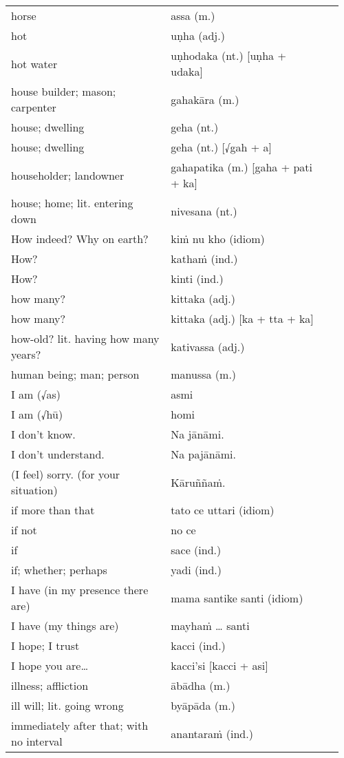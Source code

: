 \documentclass[a5paper]{memoir}
\begin{document}
\begin{longtable}{L{0.48\linewidth} L{0.48\linewidth} H}
horse & assa (m.) & \\[0pt]
hot & uṇha (adj.) & \\[0pt]
hot water & uṇhodaka (nt.) [uṇha + udaka] & \\[0pt]
house builder; mason; carpenter & gahakāra (m.) & \\[0pt]
house; dwelling & geha (nt.) & \\[0pt]
house; dwelling & geha (nt.) [√gah + a] & \\[0pt]
householder; landowner & gahapatika (m.) [gaha + pati + ka] & \\[0pt]
house; home; lit. entering down & nivesana (nt.) & \\[0pt]
How indeed? Why on earth? & kiṁ nu kho (idiom) & \\[0pt]
How? & kathaṁ (ind.) & \\[0pt]
How? & kinti (ind.) & \\[0pt]
how many? & kittaka (adj.) & \\[0pt]
how many? & kittaka (adj.) [ka + tta + ka] & \\[0pt]
how-old? lit. having how many years? & kativassa (adj.) & \\[0pt]
human being; man; person & manussa (m.) & \\[0pt]
I am (√as) & asmi & \\[0pt]
I am (√hū) & homi & \\[0pt]
I don't know. & Na jānāmi. & \\[0pt]
I don't understand. & Na pajānāmi. & \\[0pt]
(I feel) sorry. (for your situation) & Kāruññaṁ. & \\[0pt]
if more than that & tato ce uttari (idiom) & \\[0pt]
if not & no ce & \\[0pt]
if & sace (ind.) & \\[0pt]
if; whether; perhaps & yadi (ind.) & \\[0pt]
I have (in my presence there are) & mama santike santi (idiom) & \\[0pt]
I have (my things are) & mayhaṁ \ldots{} santi & \\[0pt]
I hope; I trust & kacci (ind.) & \\[0pt]
I hope you are\ldots{} & kacci'si [kacci + asi] & \\[0pt]
illness; affliction & ābādha (m.) & \\[0pt]
ill will; lit. going wrong & byāpāda (m.) & \\[0pt]
immediately after that; with no interval & anantaraṁ (ind.) & \\[0pt]

\end{longtable}
\end{document}

